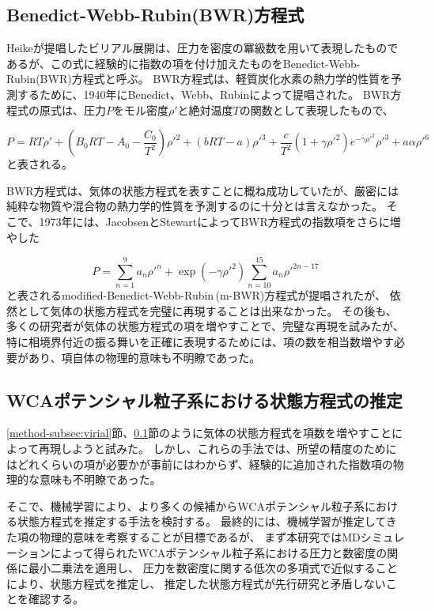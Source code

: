 \documentclass[titlepage]{jsreport}
\begin{document}
{{{\newpage
\subsection{Benedict-Webb-Rubin(BWR)方程式}\label{method-subsec:BWR}
Heikeが提唱したビリアル展開は、圧力を密度の冪級数を用いて表現したものであるが、この式に経験的に指数の項を付け加えたものをBenedict-Webb-Rubin(BWR)方程式と呼ぶ。
BWR方程式は、軽質炭化水素の熱力学的性質を予測するために、1940年にBenedict、Webb、Rubinによって提唱された\cite{BWR-equation:original}。
BWR方程式の原式は、圧力$P$をモル密度${\rho}'$と絶対温度$T$の関数として表現したもので、

\large
\begin{equation}
P=RT{\rho}'+\left(B_0RT-A_0-{\frac{C_0}{T^2}}\right){{\rho}'}^2+(bRT-a){{\rho}'}^3+{\frac{c}{T^2}}(1+{\gamma}{{\rho}'}^2)e^{-{\gamma}{{\rho}'}^2}{{\rho}'}^3+a{\alpha}{{\rho}'}^6\label{eq:BWR}
\end{equation}
\normalsize
と表される。

BWR方程式は、気体の状態方程式を表すことに概ね成功していたが、厳密には純粋な物質や混合物の熱力学的性質を予測するのに十分とは言えなかった。
そこで、1973年には、JacobsenとStewartによってBWR方程式の指数項をさらに増やした

\large
\begin{equation}
P=\sum_{n=1}^9a_n{{\rho}'}^n+\exp(-{\gamma}{{\rho}'}^2)\sum_{n=10}^{15}a_n{{\rho}'}^{2n-17}\label{eq:m-BWR}
\end{equation}
\normalsize
と表されるmodified-Benedict-Webb-Rubin\,(m-BWR)方程式が提唱\cite{m-BWR-equation}されたが、
依然として気体の状態方程式を完璧に再現することは出来なかった。
その後も、多くの研究者が気体の状態方程式の項を増やすことで、完璧な再現を試みた\cite{MCCARTY1974276,BWR-equation:13,BWR-equation:25}が、
特に相境界付近の振る舞いを正確に表現するためには、項の数を相当数増やす必要があり、項自体の物理的意味も不明瞭であった。

\subsection{WCAポテンシャル粒子系における状態方程式の推定}\label{method-subsec:WCA-equation}
\ref{method-subsec:virial}節、\ref{method-subsec:BWR}節のように気体の状態方程式を項数を増やすことによって再現しようと試みた。
しかし、これらの手法では、所望の精度のためにはどれくらいの項が必要かが事前にはわからず、経験的に追加された指数項の物理的な意味も不明瞭であった。


そこで、機械学習により、より多くの候補からWCAポテンシャル粒子系における状態方程式を推定する手法を検討する。
最終的には、機械学習が推定してきた項の物理的意味を考察することが目標であるが、
まず本研究ではMDシミュレーションによって得られたWCAポテンシャル粒子系における圧力と数密度の関係に最小二乗法を適用し、
圧力を数密度に関する低次の多項式で近似することにより、状態方程式を推定し、
推定した状態方程式が先行研究と矛盾しないことを確認する。

}}}
\end{document}

